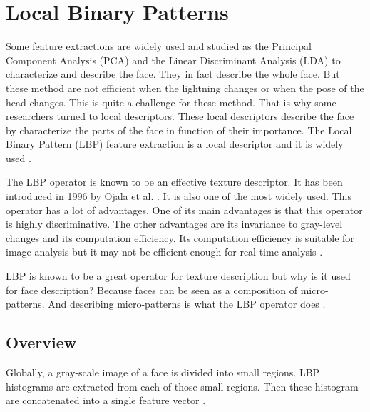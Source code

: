 \chapter{Local Binary Patterns}
\label{chap:lbp}

\noindent Some feature extractions are widely used and studied as the Principal Component Analysis (PCA) and the Linear Discriminant Analysis (LDA) to characterize and describe the face. They in fact describe the whole face. But these method are not efficient when the lightning changes or when the pose of the head changes. This is quite a challenge for these method. That is why some researchers turned to local descriptors. These local descriptors describe the face by characterize the parts of the face in function of their importance. The Local Binary Pattern (LBP) feature extraction is a local descriptor and it is widely used \cite{AHO06}.
\newline

\noindent The LBP operator is known to be an effective texture descriptor. It has been introduced in 1996 by Ojala et al. \cite{OJA96}. It is also one of the most widely used. This operator has a lot of advantages. One of its main advantages is that this operator is highly discriminative. The other advantages are its invariance to gray-level changes and its computation efficiency. Its computation efficiency is suitable for image analysis but it may not be efficient enough for real-time analysis \cite{AHO06}.
\newline

\noindent LBP is known to be a great operator for texture description but why is it used for face description? Because faces can be seen as a composition of micro-patterns. And describing micro-patterns is what the LBP operator does \cite{AHO06}.
\newline

\section{Overview}

\vspace{\baselineskip}
\noindent Globally, a gray-scale image of a face is divided into small regions. LBP histograms are extracted from each of those small regions. Then these histogram are concatenated into a single feature vector \cite{JUL07}.
\newline

